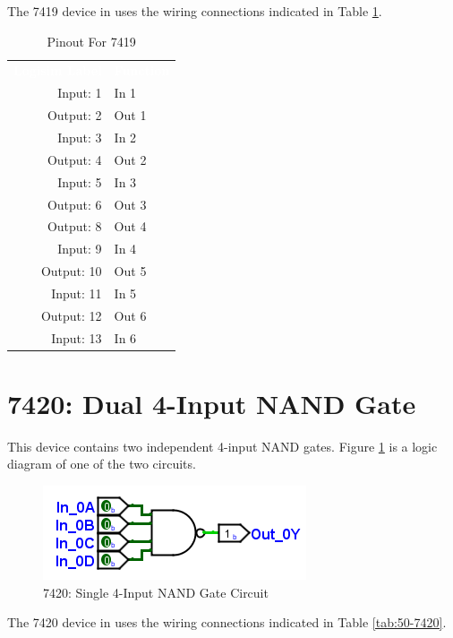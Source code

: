 The 7419 device in \LE uses the wiring connections indicated in Table \ref{tab:50-7419}.

\begin{table}[H]
	\sffamily
	\newcommand{\head}[1]{\textcolor{white}{\textbf{#1}}}		
	\begin{center}
		\begin{tabular}{rl} 
			\rowcolor{black!75}
			\head{Logisim Label} & \head{Function} \\
			Input: 1   & In 1  \\
			Output: 2  & Out 1  \\
			Input: 3   & In 2 \\
			Output: 4  & Out 2  \\
			Input: 5   & In 3  \\
			Output: 6  & Out 3 \\
			Output: 8  & Out 4  \\
			Input: 9   & In 4  \\
			Output: 10 & Out 5  \\
			Input: 11  & In 5  \\
			Output: 12 & Out 6 \\
			Input: 13  & In 6  \\
		\end{tabular}
	\end{center}
	\caption{Pinout For 7419}
	\label{tab:50-7419}
\end{table}

\section{7420: Dual 4-Input NAND Gate}

This device contains two independent 4-input NAND gates. Figure \ref{fig:app_ttl-7420} is a logic diagram of one of the two circuits.

\begin{figure}[H]
	\centering
	\includegraphics{gfx/app_ttl-7413}
	\caption{7420: Single 4-Input NAND Gate Circuit}
	\label{fig:app_ttl-7420}
\end{figure}

The 7420 device in \LE uses the wiring connections indicated in Table \ref{tab:50-7420}.

